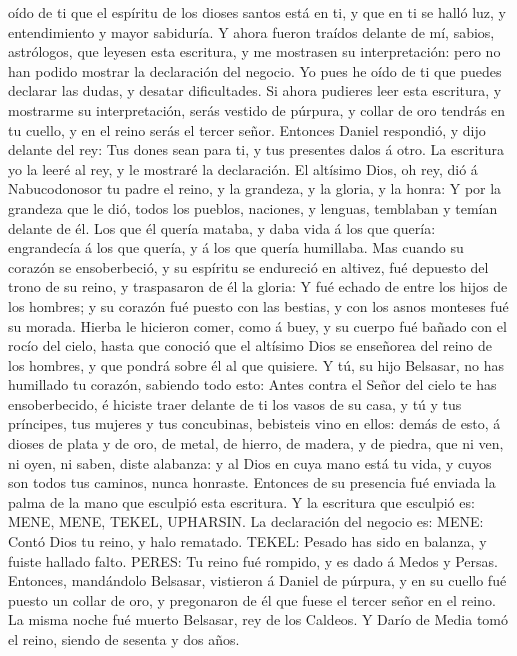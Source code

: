oído de ti que el espíritu de los dioses santos está en ti, y que en ti
se halló luz, y entendimiento y mayor sabiduría.  Y ahora
fueron traídos delante de mí, sabios, astrólogos, que leyesen esta
escritura, y me mostrasen su interpretación: pero no han podido mostrar
la declaración del negocio.  Yo pues he oído de ti que
puedes declarar las dudas, y desatar dificultades. Si ahora pudieres
leer esta escritura, y mostrarme su interpretación, serás vestido de
púrpura, y collar de oro tendrás en tu cuello, y en el reino serás el
tercer señor.  Entonces Daniel respondió, y dijo delante
del rey: Tus dones sean para ti, y tus presentes dalos á otro. La
escritura yo la leeré al rey, y le mostraré la declaración.
 El altísimo Dios, oh rey, dió á Nabucodonosor tu padre el
reino, y la grandeza, y la gloria, y la honra:  Y por la
grandeza que le dió, todos los pueblos, naciones, y lenguas, temblaban y
temían delante de él. Los que él quería mataba, y daba vida á los que
quería: engrandecía á los que quería, y á los que quería humillaba.
 Mas cuando su corazón se ensoberbeció, y su espíritu se
endureció en altivez, fué depuesto del trono de su reino, y traspasaron
de él la gloria:  Y fué echado de entre los hijos de los
hombres; y su corazón fué puesto con las bestias, y con los asnos
monteses fué su morada. Hierba le hicieron comer, como á buey, y su
cuerpo fué bañado con el rocío del cielo, hasta que conoció que el
altísimo Dios se enseñorea del reino de los hombres, y que pondrá sobre
él al que quisiere.  Y tú, su hijo Belsasar, no has
humillado tu corazón, sabiendo todo esto:  Antes contra el
Señor del cielo te has ensoberbecido, é hiciste traer delante de ti los
vasos de su casa, y tú y tus príncipes, tus mujeres y tus concubinas,
bebisteis vino en ellos: demás de esto, á dioses de plata y de oro, de
metal, de hierro, de madera, y de piedra, que ni ven, ni oyen, ni saben,
diste alabanza: y al Dios en cuya mano está tu vida, y cuyos son todos
tus caminos, nunca honraste.  Entonces de su presencia fué
enviada la palma de la mano que esculpió esta escritura.  Y
la escritura que esculpió es: MENE, MENE, TEKEL, UPHARSIN. 
La declaración del negocio es: MENE: Contó Dios tu reino, y halo
rematado.  TEKEL: Pesado has sido en balanza, y fuiste
hallado falto.  PERES: Tu reino fué rompido, y es dado á
Medos y Persas.  Entonces, mandándolo Belsasar, vistieron á
Daniel de púrpura, y en su cuello fué puesto un collar de oro, y
pregonaron de él que fuese el tercer señor en el reino.  La
misma noche fué muerto Belsasar, rey de los Caldeos.  Y
Darío de Media tomó el reino, siendo de sesenta y dos años.

